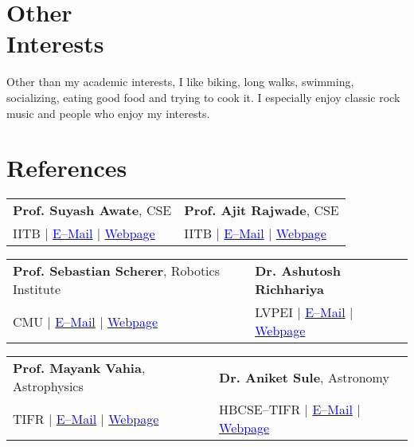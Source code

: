 \documentclass[margin,line]{res}
\begin{document}
\begin{resume}
\section{\sc Other \\Interests}
Other than my academic interests, I like biking, long walks, swimming, socializing, eating good food and trying to cook it. I especially enjoy classic rock music and people who enjoy my interests.

\section{\sc References}
\begin{tabular}{@{}p{3in}p{3in}}
\textbf{Prof. Suyash Awate}, CSE & \textbf{Prof. Ajit Rajwade}, CSE \\ 
IITB $|$ \href{mailto:suyash@cse.iitb.ac.in}{\textcolor{blue}{E--Mail}} $|$ \href{https://www.cse.iitb.ac.in/~suyash}{\textcolor{blue}{Webpage}} & IITB $|$ \href{mailto:ajitvr@cse.iitb.ac.in}{\textcolor{blue}{E--Mail}} $|$ \href{https://www.cse.iitb.ac.in/~ajitvr}{\textcolor{blue}{Webpage}} \\
\end{tabular}
\vspace{-0.15in}

\begin{tabular}{@{}p{3in}p{3in}}
\textbf{Prof. Sebastian Scherer}, Robotics Institute & \textbf{Dr. Ashutosh Richhariya}  \\ 
CMU $|$ \href{mailto:basti@andrew.cmu.edu}{\textcolor{blue}{E--Mail}} $|$ \href{http://www.ri.cmu.edu/person.html?person_id=1397}{\textcolor{blue}{Webpage}} & LVPEI $|$ \href{mailto:ashutosh@lvpei.org}{\textcolor{blue}{E--Mail}} $|$ \href{http://www.lvpei.org/our-team/our-team-ashutosh.php}{\textcolor{blue}{Webpage}} \\
\end{tabular}
\vspace{-0.15in}

\begin{tabular}{@{}p{3in}p{3in}}
\textbf{Prof. Mayank Vahia}, Astrophysics & \textbf{Dr. Aniket Sule}, Astronomy \\
TIFR $|$ \href{mailto:vahia@tifr.res.in}{\textcolor{blue}{E--Mail}} $|$ \href{http://www.tifr.res.in/~vahia/}{\textcolor{blue}{Webpage}} & HBCSE--TIFR $|$ \href{mailto:anikets@hbcse.tifr.res.in}{\textcolor{blue}{E--Mail}} $|$ \href{http://www.hbcse.tifr.res.in/people/academic/aniket-sule}{\textcolor{blue}{Webpage}} \\
\end{tabular}
\vspace{-0.15in}


\end{resume}
\end{document}
